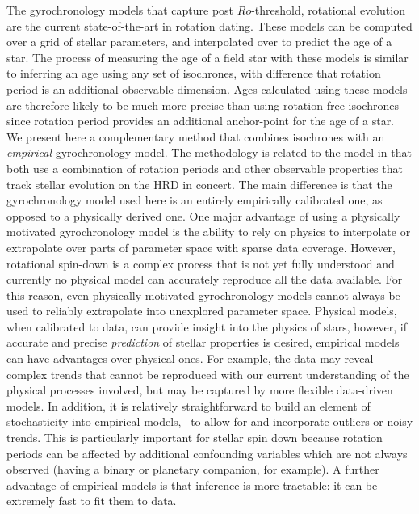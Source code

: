 The gyrochronology models that capture post $Ro$-threshold, rotational
evolution \citep{vansaders2016} are the current state-of-the-art in rotation
dating.
These models can be computed over a grid of stellar parameters, and
interpolated over to predict the age of a star.
The process of measuring the age of a field star with these models is
similar to inferring an age using any set of isochrones, with difference that
rotation period is an additional observable dimension.
Ages calculated using these models are therefore likely to be much more
precise than using rotation-free isochrones since rotation period provides an
additional anchor-point for the age of a star.
We present here a complementary method that combines isochrones with an {\it
empirical} gyrochronology model.
The methodology is related to the \citet{vansaders2016} model in that both use
a combination of rotation periods and other observable properties that track
stellar evolution on the HRD in concert.
The main difference is that the gyrochronology model used here is an entirely
empirically calibrated one, as opposed to a physically derived one.
One major advantage of using a physically motivated gyrochronology model is
the ability to rely on physics to interpolate or extrapolate over parts of
parameter space with sparse data coverage.
However, rotational spin-down is a complex process that is not yet fully
understood and currently no physical model can accurately reproduce all the
data available.
For this reason, even physically motivated gyrochronology models cannot always
be used to reliably extrapolate into unexplored parameter space.
Physical models, when calibrated to data, can provide insight into the physics
of stars, however, if accurate and precise {\it prediction} of stellar
properties is desired, empirical models can have advantages over physical
ones.
For example, the data may reveal complex trends that cannot be reproduced with
our current understanding of the physical processes involved, but may be
captured by more flexible data-driven models.
In addition, it is relatively straightforward to build an element of
stochasticity into empirical models, \ie\ to allow for and incorporate
outliers or noisy trends.
This is particularly important for stellar spin down because rotation periods
can be affected by additional confounding variables which are not always
observed (having a binary or planetary companion, for example).
A further advantage of empirical models is that inference is more tractable:
it can be extremely fast to fit them to data.

